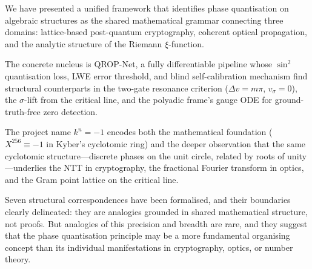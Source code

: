 \documentclass[11pt, a4paper]{article}
\theoremstyle{definition}
\theoremstyle{plain}
\newcommand{\xif}{\xi}                      %
\begin{document}
We have presented a unified framework that identifies phase quantisation
on algebraic structures as the shared mathematical grammar connecting
three domains: lattice-based post-quantum cryptography, coherent optical
propagation, and the analytic structure of the Riemann $\xif$-function.

The concrete nucleus is QROP-Net, a fully differentiable pipeline whose
$\sin^2$ quantisation loss, LWE error threshold, and blind
self-calibration mechanism find structural counterparts in the two-gate
resonance criterion ($\Delta v = m\pi$, $v_\sigma = 0$), the
$\sigma$-lift from the critical line, and the polyadic frame's gauge ODE
for ground-truth-free zero detection.

The project name $k^n = -1$ encodes both the mathematical foundation
($X^{256} \equiv -1$ in Kyber's cyclotomic ring) and the deeper
observation that the same cyclotomic structure---discrete phases on the
unit circle, related by roots of unity---underlies the NTT in
cryptography, the fractional Fourier transform in optics, and the Gram
point lattice on the critical line.

Seven structural correspondences have been formalised, and their
boundaries clearly delineated: they are analogies grounded in shared
mathematical structure, not proofs. But analogies of this precision and
breadth are rare, and they suggest that the phase quantisation principle
may be a more fundamental organising concept than its individual
manifestations in cryptography, optics, or number theory.
\end{document}
